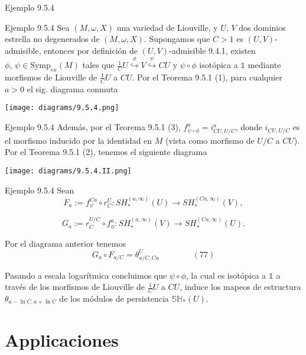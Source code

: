 \documentclass{beamer}
\begin{document}
\begin{frame}{Ejemplo 9.5.4}
\begin{block}{Ejemplo 9.5.4}
Sea $(M,\omega,X)$ una variedad de Liouville, y $U,\,V$ dos dominios estrella no degenerados de $(M,\omega,X)$. Supongamos que $C>1$ es $(U,V)$-admisible, entonces por definici\'on de $(U,V)$-admisible 9.4.1, existen $\phi,\,\psi \in \mbox{Symp}_{ex}(M)$ tales que $\frac{1}{C}U \overset{\phi}{\hookrightarrow} V \overset{\psi}{\hookrightarrow} CU$ y $\psi\circ\phi$ isot\'opica a $\mathbb{1}$ mediante morfismos de Liouville de $\frac{1}{C}U$ a $CU$. Por el Teorema 9.5.1 (1), para cualquier $a>0$ el sig. diagrama conmuta
\begin{center}
\texttt{[image: diagrams/9.5.4.png]}
\end{center}
\end{block}
\end{frame}


\begin{frame}{Ejemplo 9.5.4}
Adem\'as, por el Teorema 9.5.1 (3), $f_{\psi\circ\phi}^{a}=i_{CU,U/C}^{a}$, donde $i_{CU,U/C}$ es el morfismo inducido por la identidad en $M$ (vista como morfismo de $U/C$ a $CU$). Por el Teorema 9.5.1 (2), tenemos el siguiente diagrama 
\begin{center}
\texttt{[image: diagrams/9.5.4.II.png]}
\end{center}
\end{frame}

\begin{frame}{Ejemplo 9.5.4}
Sean $$F_{a}:=f_{\psi}^{Ca}\circ r_{C}^{U}:SH_{\ast}^{(a,\infty)}(U)\rightarrow SH_{\ast}^{(Ca,\infty)}(V),$$

$$G_{a}:= r_{C}^{U/C}\circ f_{\phi}^{a}:SH_{\ast}^{(a,\infty)}(V)\rightarrow SH_{\ast}^{(Ca,\infty)}(U).$$

Por el diagrama anterior tenemos $$G_{a} \circ F_{a/C}=\theta_{a/C,Ca}^{U}\hspace{4em}(77)$$

Pasando a escala logar\'itmica concluimos que $\psi \circ\phi$, la cual es isot\'opica a $\mathbb{1}$ a trav\'es de los morfismos de Liouville de $\frac{1}{C}U$ a $CU$, induce los mapeos de estructura $\theta_{a-\ln C,a+\ln C}$ de los m\'odulos de persistencia $\mathbb{SH}_{\ast}(U)$.
\end{frame}

\section{Applicaciones}
\end{document}
